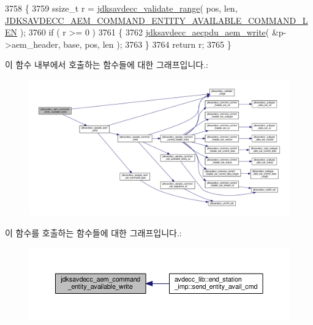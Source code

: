 \begin{DoxyCode}
3758 \{
3759     ssize\_t r = \hyperlink{group__util_ga9c02bdfe76c69163647c3196db7a73a1}{jdksavdecc\_validate\_range}( pos, len, 
      \hyperlink{group__command__entity__available_ga30ae597e2bbf5439d01764cc00618fd7}{JDKSAVDECC\_AEM\_COMMAND\_ENTITY\_AVAILABLE\_COMMAND\_LEN} );
3760     \textcolor{keywordflow}{if} ( r >= 0 )
3761     \{
3762         \hyperlink{group__aecpdu__aem_gad658e55771cce77cecf7aae91e1dcbc5}{jdksavdecc\_aecpdu\_aem\_write}( &p->aem\_header, base, pos, len );
3763     \}
3764     \textcolor{keywordflow}{return} r;
3765 \}
\end{DoxyCode}


이 함수 내부에서 호출하는 함수들에 대한 그래프입니다.\+:
\nopagebreak
\begin{figure}[H]
\begin{center}
\leavevmode
\includegraphics[width=350pt]{group__command__entity__available_gaa12d3055d62b15ce98d231278ab54288_cgraph}
\end{center}
\end{figure}




이 함수를 호출하는 함수들에 대한 그래프입니다.\+:
\nopagebreak
\begin{figure}[H]
\begin{center}
\leavevmode
\includegraphics[width=350pt]{group__command__entity__available_gaa12d3055d62b15ce98d231278ab54288_icgraph}
\end{center}
\end{figure}


